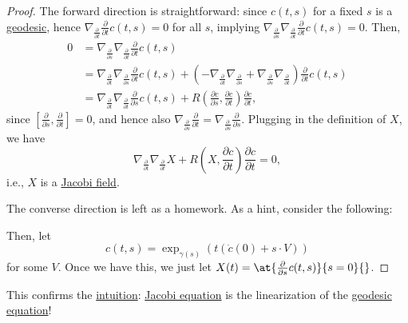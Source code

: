 \begin{proof}
	The forward direction is straightforward: since \(c(t, s)\) for a fixed \(s\) is a \hyperref[def:geodesic]{geodesic}, hence \(\nabla _{\frac{\partial }{\partial t} }\frac{\partial }{\partial t} c(t, s) = 0\) for all \(s\), implying \(\nabla _{\frac{\partial }{\partial s} } \nabla _{\frac{\partial }{\partial t} } \frac{\partial }{\partial t} c(t, s) = 0\). Then,
	\[
		\begin{split}
			0&= \nabla _{\frac{\partial }{\partial s} } \nabla _{\frac{\partial }{\partial t} } \frac{\partial }{\partial t} c(t, s)\\
			&=\nabla _{\frac{\partial }{\partial t} }\nabla _{\frac{\partial }{\partial s} }\frac{\partial }{\partial t} c(t, s)
			+ \left( - \nabla _{\frac{\partial }{\partial t} } \nabla _{\frac{\partial }{\partial s} } + \nabla _{\frac{\partial }{\partial s} } \nabla _{\frac{\partial }{\partial t} } \right) \frac{\partial }{\partial t} c(t, s)\\
			&= \nabla _{\frac{\partial }{\partial t} }\nabla _{\frac{\partial }{\partial t} } \frac{\partial }{\partial s} c(t, s) + R\left( \frac{\partial c}{\partial s} , \frac{\partial c}{\partial t} \right) \frac{\partial c}{\partial t},
		\end{split}
	\]
	since \([\frac{\partial }{\partial s} , \frac{\partial }{\partial t} ] = 0\), and hence also \(\nabla _{\frac{\partial }{\partial s} } \frac{\partial }{\partial t} = \nabla _{\frac{\partial }{\partial s} } \frac{\partial }{\partial s} \). Plugging in the definition of \(X\), we have
	\[
		\nabla _{\frac{\partial }{\partial t} }\nabla _{\frac{\partial }{\partial t} } X
		+ R\left( X, \frac{\partial c}{\partial t} \right) \frac{\partial c}{\partial t} = 0,
	\]
	i.e., \(X\) is a \hyperref[def:Jacobi-field]{Jacobi field}.

	The converse direction is left as a homework. As a hint, consider the following:
	\begin{center}
	\end{center}
	Then, let
	\[
		c(t, s) = \exp _{\gamma (s)} \left( t(\dot{c} (0) + s\cdot V) \right)
	\]
	for some \(V\). Once we have this, we just let \(X (t)= \at{\frac{\partial }{\partial s} c(t, s)}{s = 0}{} \).
\end{proof}

\begin{remark}
	This confirms the \hyperref[int:Jacobi-equation]{intuition}: \hyperref[eq:Jacobi]{Jacobi equation} is the linearization of the \hyperref[eq:geodesic]{geodesic equation}!
\end{remark}

